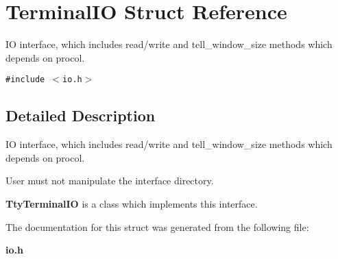 \section{Terminal\-IO Struct Reference}
\label{structTerminalIO}
IO interface, which includes read/write and tell\_\-window\_\-size methods which depends on procol. 


{\tt \#include $<$io.h$>$}



\subsection{Detailed Description}
IO interface, which includes read/write and tell\_\-window\_\-size methods which depends on procol.

\par
 User must not manipulate the interface directory. \par
 {\bf Tty\-Terminal\-IO } is a class which implements this interface. 



The documentation for this struct was generated from the following file:\begin{CompactItemize}
\item 
{\bf io.h}\end{CompactItemize}
